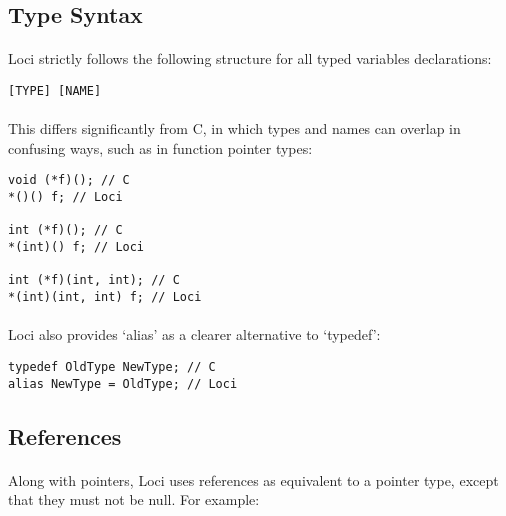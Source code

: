 \documentclass[12pt,twoside,notitlepage]{report}
\begin{document}
\clearpage

\subsection{Type Syntax}

\paragraph{}
Loci strictly follows the following structure for all typed variables declarations:


\begin{lstlisting}
[TYPE] [NAME]
\end{lstlisting}


\paragraph{}
This differs significantly from C, in which types and names can overlap in confusing ways, such as in function pointer types:


\begin{lstlisting}
void (*f)(); // C
*()() f; // Loci

int (*f)(); // C
*(int)() f; // Loci

int (*f)(int, int); // C
*(int)(int, int) f; // Loci
\end{lstlisting}


\paragraph{}
Loci also provides `alias' as a clearer alternative to `typedef':


\begin{lstlisting}
typedef OldType NewType; // C
alias NewType = OldType; // Loci
\end{lstlisting}


\clearpage

\subsection{References}

\paragraph{}
Along with pointers, Loci uses references as equivalent to a pointer type, except that they must not be null. For example:
\end{document}
